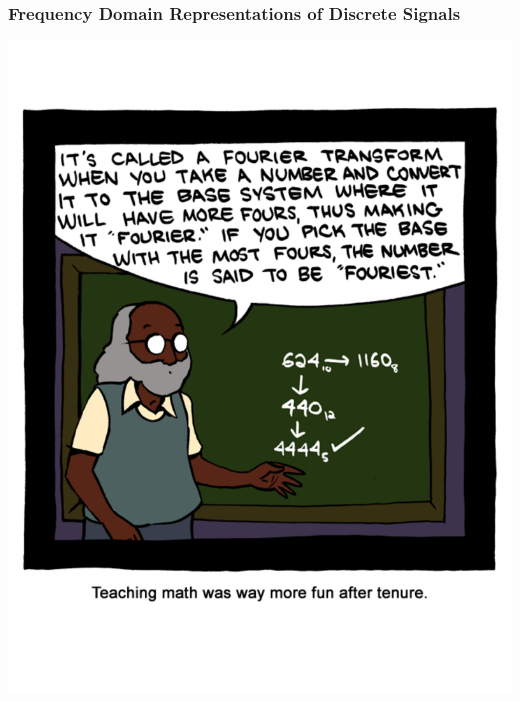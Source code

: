 \documentclass[mathserif,9pt,handout]{beamer}
\begin{document}
\begin{frame}\frametitle{Frequency Domain Representations of Discrete Signals}\small
  \begin{center}
    \includegraphics[height=\textheight]{fourier.pdf}
  \end{center}
\end{frame}
\end{document}
